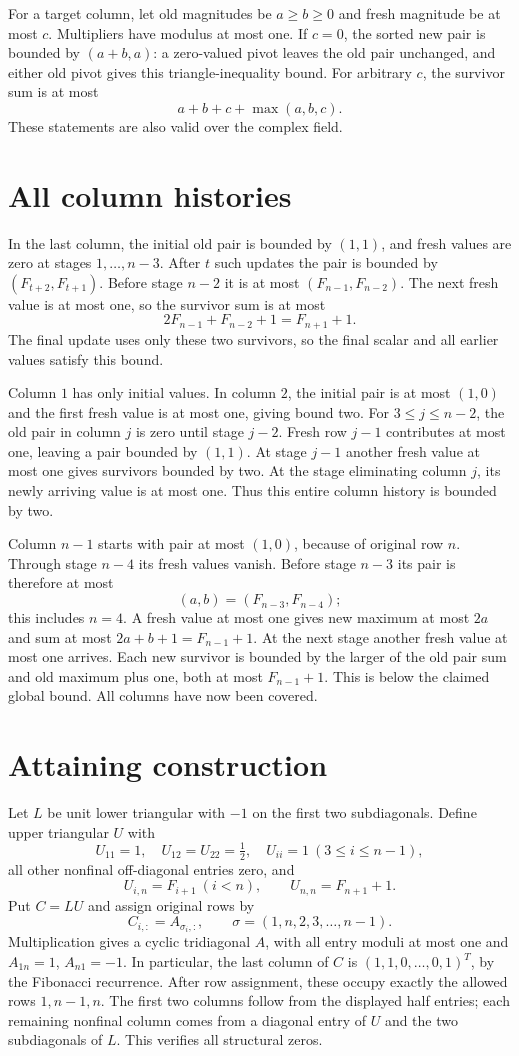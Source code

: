 \documentclass[11pt]{article}
\begin{document}
For a target column, let old magnitudes be $a\ge b\ge0$ and fresh magnitude be at most $c$. Multipliers have modulus at most one. If $c=0$, the sorted new pair is bounded by $(a+b,a)$: a zero-valued pivot leaves the old pair unchanged, and either old pivot gives this triangle-inequality bound. For arbitrary $c$, the survivor sum is at most
\[a+b+c+\max(a,b,c).\]
These statements are also valid over the complex field.
\section{All column histories}
In the last column, the initial old pair is bounded by $(1,1)$, and fresh values are zero at stages $1,\ldots,n-3$. After $t$ such updates the pair is bounded by $(F_{t+2},F_{t+1})$. Before stage $n-2$ it is at most $(F_{n-1},F_{n-2})$. The next fresh value is at most one, so the survivor sum is at most
\[2F_{n-1}+F_{n-2}+1=F_{n+1}+1.\]
The final update uses only these two survivors, so the final scalar and all earlier values satisfy this bound.

Column $1$ has only initial values. In column $2$, the initial pair is at most $(1,0)$ and the first fresh value is at most one, giving bound two. For $3\le j\le n-2$, the old pair in column $j$ is zero until stage $j-2$. Fresh row $j-1$ contributes at most one, leaving a pair bounded by $(1,1)$. At stage $j-1$ another fresh value at most one gives survivors bounded by two. At the stage eliminating column $j$, its newly arriving value is at most one. Thus this entire column history is bounded by two.

Column $n-1$ starts with pair at most $(1,0)$, because of original row $n$. Through stage $n-4$ its fresh values vanish. Before stage $n-3$ its pair is therefore at most
\[(a,b)=(F_{n-3},F_{n-4});\]
this includes $n=4$. A fresh value at most one gives new maximum at most $2a$ and sum at most $2a+b+1=F_{n-1}+1$. At the next stage another fresh value at most one arrives. Each new survivor is bounded by the larger of the old pair sum and old maximum plus one, both at most $F_{n-1}+1$. This is below the claimed global bound. All columns have now been covered.
\section{Attaining construction}
Let $L$ be unit lower triangular with $-1$ on the first two subdiagonals. Define upper triangular $U$ with
\[
U_{11}=1,\quad U_{12}=U_{22}=\tfrac12,\quad U_{ii}=1\ (3\le i\le n-1),
\]
all other nonfinal off-diagonal entries zero, and
\[U_{i,n}=F_{i+1}\ (i<n),\qquad U_{n,n}=F_{n+1}+1.\]
Put $C=LU$ and assign original rows by
\[C_{i,:}=A_{\sigma_i,:},\qquad\sigma=(1,n,2,3,\ldots,n-1).\]
Multiplication gives a cyclic tridiagonal $A$, with all entry moduli at most one and $A_{1n}=1$, $A_{n1}=-1$. In particular, the last column of $C$ is $(1,1,0,\ldots,0,1)^T$, by the Fibonacci recurrence. After row assignment, these occupy exactly the allowed rows $1,n-1,n$. The first two columns follow from the displayed half entries; each remaining nonfinal column comes from a diagonal entry of $U$ and the two subdiagonals of $L$. This verifies all structural zeros.
\end{document}
